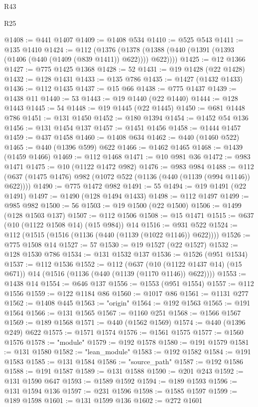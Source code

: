 \begin{lexlean}{R43}
\begin{lexlean}{R25}
\begin{coremodule}
{{{{{{{{{{{{{{{{{{{{{{{{{{{{{{{{{{{{{{{{{{{{{{{{{{{{{{{{{{{{{{{{{{{{{{{{{{{{{{{{{{{{{{{{{{{{{{{{{{{{{{{{{{{{{{{{{{{{{{{{{{{{{{{{{{{{{{{{{{{{{{{{{{{{{{{{{{{{{{{{{{{{{{{{{{{{{{{{{{{{{{{{{{{{{{{{{@1408 := @441 @1407
@1409 := @1408 @534
@1410 := @525 @543
@1411 := @135 @1410
@1424 := @112
    (@1376 (@1378 (@1388 (@440 (@1391 (@1393 (@1406 (@440 (@1409 (@839 @1411)) @622)))) @622))))
@1425 := @12 @1366
@1427 := @775 @1425 @1368
@1428 := 52
@1431 := @19 @1428 (@22 @1428)
@1432 := @128 @1431
@1433 := @135 @786
@1435 := @1427 (@1432 @1433)
@1436 := @112 @1435
@1437 := @15 @66
@1438 := @775 @1437
@1439 := @1438 @11
@1440 := 53
@1443 := @19 @1440 (@22 @1440)
@1444 := @128 @1443
@1445 := 54
@1448 := @19 @1445 (@22 @1445)
@1450 := @681 @1448 @786
@1451 := @131 @1450
@1452 := @180 @1394
@1454 := @1452 @54 @136
@1456 := @131 @1454 @137
@1457 := @1451 @1456
@1458 := @1444 @1457
@1459 := @437 @1458
@1460 := @1408 @634
@1462 := @440 (@1460 @522)
@1465 := @440 (@1396 @599) @622
@1466 := @1462 @1465
@1468 := @1439 (@1459 @1466)
@1469 := @112 @1468
@1471 := @10 @981 @36
@1472 := @983 @1471
@1475 := @10 (@1122 @1472 @982)
@1476 := @983 @984
@1488 := @112 (@637 (@1475 @1476) @982 (@1072 @522 (@1136 (@440 (@1139 (@994 @1146)) @622))))
@1490 := @775 @1472 @982
@1491 := 55
@1494 := @19 @1491 (@22 @1491)
@1497 := @1490 (@128 @1494 @1433)
@1498 := @112 @1497
@1499 := @985 @982
@1500 := 56
@1503 := @19 @1500 (@22 @1500)
@1506 := @1499 (@128 @1503 @137)
@1507 := @112 @1506
@1508 := @15 @1471
@1515 := @637 (@10 (@1122 @1508 @14) (@15 @984)) @14
@1516 := @931 @522
@1524 := @112 (@1515 (@1516 (@1136 (@440 (@1139 (@1022 @1146)) @622))))
@1526 := @775 @1508 @14
@1527 := 57
@1530 := @19 @1527 (@22 @1527)
@1532 := @128 @1530 @786
@1534 := @131 @1532 @137
@1536 := @1526 (@951 @1534)
@1537 := @112 @1536
@1552 := @112
    (@637 (@10 (@1122 @1437 @14) (@15 @671)) @14 (@1516 (@1136 (@440 (@1139 (@1170 @1146)) @622))))
@1553 := @1438 @14
@1554 := @646 @137
@1556 := @1553 (@951 @1554)
@1557 := @112 @1556
@1559 := @122 @1184 @86
@1560 := @1017 @86
@1561 := @1131 @277
@1562 := @1408 @445
@1563 := "origin"
@1564 := @192 @1563
@1565 := @191 @1564
@1566 := @131 @1565
@1567 := @1160 @251
@1568 := @1566 @1567
@1569 := @189 @1568
@1571 := @440 (@1562 @1569)
@1574 := @440 (@1396 @249) @622
@1575 := @1571 @1574
@1576 := @1561 @1575
@1577 := @1560 @1576
@1578 := "module"
@1579 := @192 @1578
@1580 := @191 @1579
@1581 := @131 @1580
@1582 := "lean_module"
@1583 := @192 @1582
@1584 := @191 @1583
@1585 := @131 @1584
@1586 := "source_path"
@1587 := @192 @1586
@1588 := @191 @1587
@1589 := @131 @1588
@1590 := @201 @243
@1592 := @131 @1590 @647
@1593 := @1589 @1592
@1594 := @189 @1593
@1596 := @131 @1594 @136
@1597 := @231 @1596
@1598 := @1585 @1597
@1599 := @189 @1598
@1601 := @131 @1599 @136
@1602 := @272 @1601
}}}}}}}}}}}}}}}}}}}}}}}}}}}}}}}}}}}}}}}}}}}}}}}}}}}}}}}}}}}}}}}}}}}}}}}}}}}}}}}}}}}}}}}}}}}}}}}}}}}}}}}}}}}}}}}}}}}}}}}}}}}}}}}}}}}}}}}}}}}}}}}}}}}}}}}}}}}}}}}}}}}}}}}}}}}}}}}}}}}}}}}}}}}}}}}}}
\end{coremodule}
\end{lexlean}
\end{lexlean}
